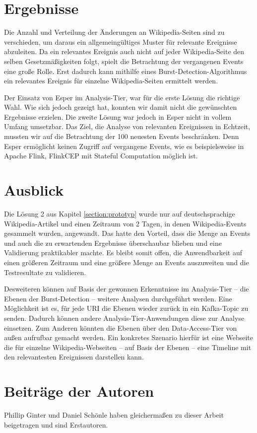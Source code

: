 \section{Ergebnisse}
Die Anzahl und Verteilung der Änderungen an Wikipedia-Seiten sind zu verschieden, um daraus ein allgemeingültiges Muster für relevante Ereignisse abzuleiten.
Da ein relevantes Ereignis auch nicht auf jeder Wikipedia-Seite den selben Gesetzmäßigkeiten folgt, spielt die Betrachtung der vergangenen Events eine große Rolle.
Erst dadurch kann mithilfe eines Burst-Detection-Algorithmus ein relevantes Ereignis für einzelne Wikipedia-Seiten ermittelt werden.

Der Einsatz von Esper im Analysis-Tier, war für die erste Lösung die richtige Wahl. Wie sich jedoch gezeigt hat, konnten wir damit
nicht die gewünschten Ergebnisse erzielen. Die zweite Lösung war jedoch in Esper nicht in vollem Umfang umsetzbar.
Das Ziel, die Analyse von relevanten Ereignissen in Echtzeit, mussten wir auf die Betrachtung der 100 neuesten Events beschränken.
Denn Esper ermöglicht keinen Zugriff auf vergangene Events, wie es beispielsweise in Apache Flink, FlinkCEP mit Stateful Computation möglich ist\cite{Friedman:2016:IAF:3126171}.

\section{Ausblick}
Die Lösung 2 aus Kapitel \ref{section:prototyp} wurde nur auf deutschsprachige Wikipedia-Artikel und einen Zeitraum von 2 Tagen, in denen Wikipedia-Events gesammelt wurden, angewandt.
Das hatte den Vorteil, dass die Menge an Events und auch die zu erwartenden Ergebnisse überschaubar blieben und eine Validierung praktikabler machte.
Es bleibt somit offen, die Anwendbarkeit auf einen größeren Zeitraum und eine größere Menge an Events auszuweiten und die Testresultate zu validieren.

Desweiteren können auf Basis der gewonnen Erkenntnisse im Analysis-Tier -- die Ebenen der Burst-Detection -- weitere Analysen durchgeführt werden.
Eine Möglichkeit ist es, für jede URI die Ebenen wieder zurück in ein Kafka-Topic zu senden. Dadurch können andere Analysis-Tier-Anwendungen diese zur Analyse einsetzen.
Zum Anderen könnten die Ebenen über den Data-Access-Tier von außen aufrufbar gemacht werden. Ein konkretes Szenario hierfür ist eine Webseite
die für einzelne Wikipedia-Webseiten -- auf Basis der Ebenen -- eine Timeline mit den relevantesten Ereignissen darstellen kann.

\section{Beiträge der Autoren}
 Phillip Ginter und Daniel Schönle haben gleichermaßen zu dieser Arbeit beigetragen und sind Erstautoren.